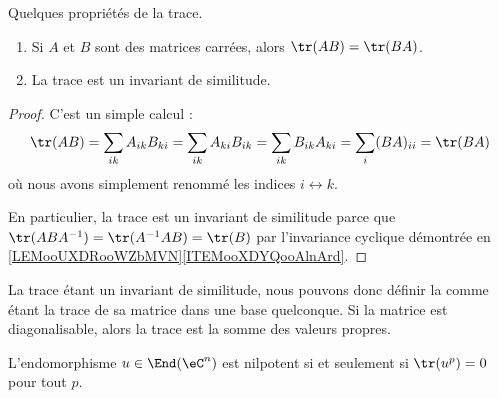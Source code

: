 \begin{lemma}   \label{LemhbZTay}
	Quelques propriétés de la trace.
	\begin{enumerate}
		\item
		      Si \( A\) et \( B\) sont des matrices carrées, alors \( \tr(AB)=\tr(BA)\).
		\item
		      La trace est un invariant de similitude.
	\end{enumerate}
\end{lemma}

\begin{proof}
	C'est un simple calcul :
	\begin{equation}
		\tr(AB)=\sum_{ik}A_{ik}B_{ki}
		=\sum_{ik}A_{ki}B_{ik}
		=\sum_{ik}B_{ik}A_{ki}
		=\sum_i(BA)_{ii}
		=\tr(BA)
	\end{equation}
	où nous avons simplement renommé les indices \( i\leftrightarrow k\).

	En particulier, la trace est un invariant de similitude parce que \( \tr(ABA^{-1})=\tr(A^{-1} AB)=\tr(B)\) par l'invariance cyclique démontrée en \ref{LEMooUXDRooWZbMVN}\ref{ITEMooXDYQooAlnArd}.
\end{proof}
La trace étant un invariant de similitude, nous pouvons donc définir la  comme étant la trace de sa matrice dans une base quelconque. Si la matrice est diagonalisable, alors la trace est la somme des valeurs propres.

\begin{lemma}   \label{LemzgNOjY}
	L'endomorphisme \( u\in\End(\eC^n)\) est nilpotent si et seulement si \( \tr(u^p)=0\) pour tout \( p\).
\end{lemma}

